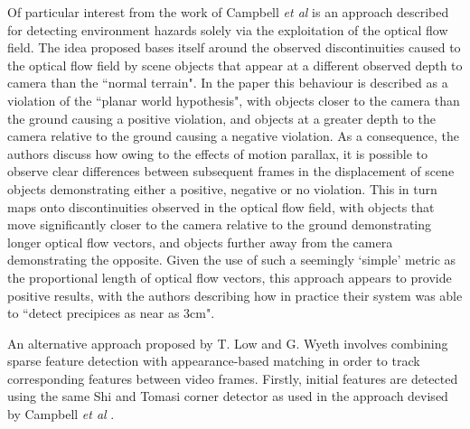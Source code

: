 Of particular interest from the work of Campbell \textit{et al} \cite{campbell} is an approach described for detecting environment hazards solely via the exploitation of the optical flow field. The idea proposed bases itself around the observed discontinuities caused to the optical flow field by scene objects that appear at a different observed depth to camera than the ``normal terrain". In the paper this behaviour is described as a violation of the ``planar world hypothesis", with objects closer to the camera than the ground causing a positive violation, and objects at a greater depth to the camera relative to the ground causing a negative violation. As a consequence, the authors discuss how owing to the effects of motion parallax, it is possible to observe clear differences between subsequent frames in the displacement of scene objects demonstrating either a positive, negative or no violation. This in turn maps onto discontinuities observed in the optical flow field, with objects that move significantly closer to the camera relative to the ground demonstrating longer optical flow vectors, and objects further away from the camera demonstrating the opposite. Given the use of such a seemingly `simple' metric as the proportional length of optical flow vectors, this approach appears to provide positive results, with the authors describing how in practice their system was able to ``detect precipices as near as 3cm". 

An alternative approach proposed by T. Low and G. Wyeth \cite{low-wyeth} involves combining sparse feature detection with appearance-based matching in order to track corresponding features between video frames. Firstly, initial features are detected using the same Shi and Tomasi corner detector \cite{shi-tomasi-good-features-to-track} as used in the approach devised by Campbell \textit{et al} \cite{low-wyeth}. 


